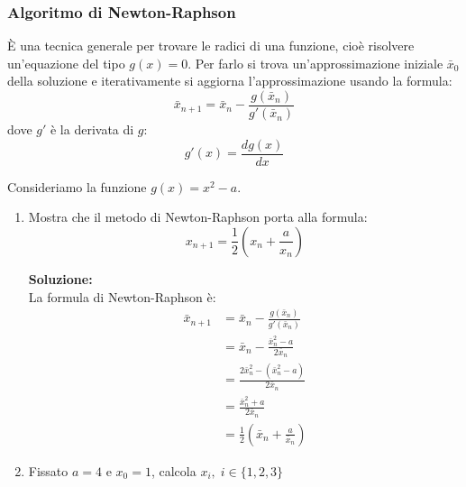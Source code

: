 \documentclass[a4paper]{article}
\begin{document}
\subsubsection{Algoritmo di Newton-Raphson}
È una tecnica generale per trovare le radici di una funzione, cioè risolvere un'equazione
del tipo \( g(x) = 0 \). Per farlo si trova un'approssimazione iniziale \( \bar{x}_0 \) della
soluzione e iterativamente si aggiorna l'approssimazione usando la formula:
\[
  \bar{x}_{n+1} = \bar{x}_n - \frac{g(\bar{x}_n)}{g'(\bar{x}_n)}
\] 
dove \( g' \) è la derivata di \( g \):
\[
  g'(x) = \frac{dg(x)}{dx}
\] 
\begin{example}
  Consideriamo la funzione \( g(x) = x^2 - a \).
  \begin{enumerate}
    \item 
      Mostra che il
      metodo di Newton-Raphson porta alla formula:
      \[
        x_{n+1} = \frac{1}{2} \left( x_n + \frac{a}{x_n} \right)
      \] 

      \vspace{1em}
      \noindent
      \textbf{Soluzione:}\\
      La formula di Newton-Raphson è:
      \[
        \begin{aligned}
          \bar{x}_{n+1} &= \bar{x}_n - \frac{g(\bar{x}_n)}{g'(\bar{x}_n)}\\
                        &= \bar{x}_n - \frac{\bar{x}_n^2 - a}{2\bar{x}_n} \\
                        &= \frac{2 \bar{x}_n^2 - (\bar{x}_n^2 - a)}{2\bar{x}_n}\\
                        &= \frac{\bar{x}_n^2 + a}{2\bar{x}_n} \\
                        &= \frac{1}{2} \left( \bar{x}_n + \frac{a}{\bar{x}_n} \right)
        \end{aligned}
      \] 


    \item Fissato \( a = 4 \) e \( x_0 = 1 \), calcola \( x_i, \; i \in \{1,2,3\}  \) 


\end{enumerate}
\end{example}
\end{document}
